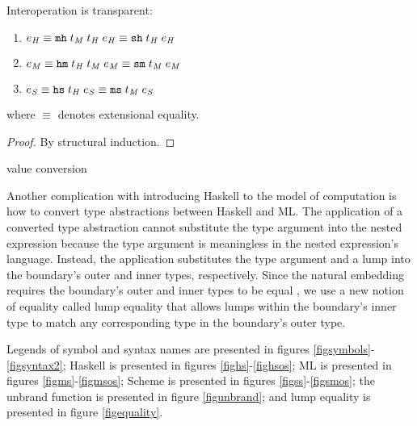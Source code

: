 \begin{theorem}{Interoperation is transparent:}
\label{thmtransparent}
\begin{enumerate}
\item $e_{\mathit{H}} \equiv \mathtt{mh} \; t_{\mathit{M}} \; t_{\mathit{H}} \; e_{\mathit{H}} \equiv \mathtt{sh} \; t_{\mathit{H}} \; e_{\mathit{H}}$
\item $e_{\mathit{M}} \equiv \mathtt{hm} \; t_{\mathit{H}} \; t_{\mathit{M}} \; e_{\mathit{M}} \equiv \mathtt{sm} \; t_{\mathit{M}} \; e_{\mathit{M}}$
\item $e_{\mathit{S}} \equiv \mathtt{hs} \; t_{\mathit{H}} \; e_{\mathit{S}} \equiv \mathtt{ms} \; t_{\mathit{M}} \; e_{\mathit{S}}$
\end{enumerate}
where $\equiv$ denotes extensional equality.
\begin{proof}
By structural induction.
\end{proof}
\end{theorem}

value conversion

Another complication with introducing Haskell to the model of computation is how to convert type abstractions between Haskell and ML. The application of a converted type abstraction cannot substitute the type argument into the nested expression because the type argument is meaningless in the nested expression's language. Instead, the application substitutes the type argument and a lump into the boundary's outer and inner types, respectively. Since the natural embedding requires the boundary's outer and inner types to be equal \cite{matthews07}, we use a new notion of equality called lump equality that allows lumps within the boundary's inner type to match any corresponding type in the boundary's outer type.

Legends of symbol and syntax names are presented in figures \ref{figsymbols}-\ref{figsyntax2}; Haskell is presented in figures \ref{fighs}-\ref{fighsos}; ML is presented in figures \ref{figms}-\ref{figmsos}; Scheme is presented in figures \ref{figss}-\ref{figsmos}; the unbrand function is presented in figure \ref{figunbrand}; and lump equality is presented in figure \ref{figequality}.

\clearpage



\clearpage



\clearpage



\clearpage



